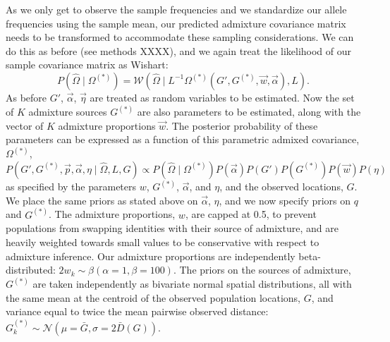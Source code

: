 \documentclass[12pt]{article}
\newcommand{\identifyadmixsource}[1]{{#1^{(*)}}}
\begin{document}
As we only get to observe the sample frequencies and we standardize our allele frequencies using the sample mean, our predicted admixture covariance matrix needs to be transformed to accommodate these sampling considerations. We can do this as before (see methods XXXX), and we again treat the likelihood of our sample covariance matrix as Wishart:
\begin{equation}
\label{eq:wishart_dist_admixed}
P(\widehat{\Omega} \mid \identifyadmixsource{\Omega}) = 
	\mathcal{W}\left(\widehat{\Omega} \mid L^{-1} \identifyadmixsource{\Omega} \left( G',\identifyadmixsource{G}, \vec{w},\vec{\alpha}\right),L \right)	\text{.}
\end{equation}
As before $G'$, $\vec{\alpha}$, $\vec{\eta}$ are treated as random variables to be estimated. Now the set of $K$ admixture sources $\identifyadmixsource{G}$ are also parameters to be estimated, along with the vector of $K$ admixture proportions $\vec{w}$. The posterior probability of these parameters can be expressed as a function of this parametric admixed covariance, $\identifyadmixsource{\Omega}$,
\begin{equation}
\label{eq:admixed_post_prob}
P(G',\identifyadmixsource{G}, \vec{p},\vec{\alpha}, \eta \mid \widehat{\Omega}, L,G) 
	\propto  
		P(\widehat{\Omega}  \mid \identifyadmixsource{\Omega}) P(\vec{\alpha}) P(G') P(\identifyadmixsource{G}) P(\vec{w}) P(\eta) 
\end{equation}
%
as specified by the parameters $w$, $\identifyadmixsource{G}$, $\vec{\alpha}$, and $\eta$, and the observed locations, $G$.  We place the same priors as stated above on $\vec{\alpha}$, $\eta$, and we now specify priors on $q$ and $\identifyadmixsource{G}$.  The admixture proportions, $w$, are capped at 0.5, to prevent populations from swapping identities with their source of admixture, and are heavily weighted towards small values to be conservative with respect to admixture inference.  Our admixture proportions are independently beta-distributed: $2 w_k \sim \beta(\alpha = 1,\beta = 100)$.  The priors on the sources of admixture, $\identifyadmixsource{G}$ are taken independently as bivariate normal spatial distributions, all with the same mean at the centroid of the observed population locations, $G$, and variance equal to twice the mean pairwise observed distance:  $\identifyadmixsource{G_k} \sim \mathcal{N}(\mu = \bar{G},\sigma = 2 \bar{D}(G))$.


\end{document}
